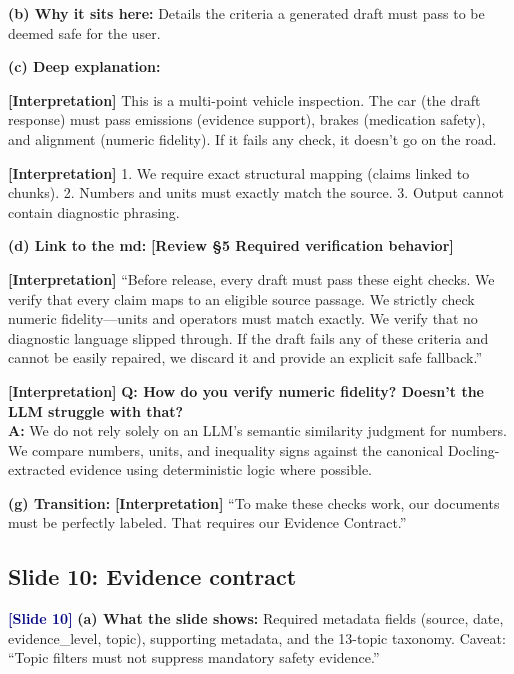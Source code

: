 \documentclass[11pt,a4paper]{article}
\newcommand{\origintag}[2]{\textcolor{#1}{\small\textbf{[#2]}}}
\begin{document}
\textbf{(b) Why it sits here:} Details the criteria a generated draft must pass to be deemed safe for the user.

\textbf{(c) Deep explanation:}
\begin{analogy}
\origintag{slate}{Interpretation} This is a multi-point vehicle inspection. The car (the draft response) must pass emissions (evidence support), brakes (medication safety), and alignment (numeric fidelity). If it fails any check, it doesn't go on the road.
\end{analogy}
\origintag{slate}{Interpretation} 1. We require exact structural mapping (claims linked to chunks). 2. Numbers and units must exactly match the source. 3. Output cannot contain diagnostic phrasing.

\textbf{(d) Link to the md:} \origintag{amber}{Review \S5 Required verification behavior}

\begin{sayit}
\origintag{slate}{Interpretation} ``Before release, every draft must pass these eight checks. We verify that every claim maps to an eligible source passage. We strictly check numeric fidelity---units and operators must match exactly. We verify that no diagnostic language slipped through. If the draft fails any of these criteria and cannot be easily repaired, we discard it and provide an explicit safe fallback.''
\end{sayit}

\begin{qa}
\origintag{slate}{Interpretation} \textbf{Q: How do you verify numeric fidelity? Doesn't the LLM struggle with that?} \\
\textbf{A:} We do not rely solely on an LLM's semantic similarity judgment for numbers. We compare numbers, units, and inequality signs against the canonical Docling-extracted evidence using deterministic logic where possible.
\end{qa}
\textbf{(g) Transition:} \origintag{slate}{Interpretation} ``To make these checks work, our documents must be perfectly labeled. That requires our Evidence Contract.''

\subsection{Slide 10: Evidence contract}
\origintag{navy}{Slide 10}
\textbf{(a) What the slide shows:} Required metadata fields (source, date, evidence\_level, topic), supporting metadata, and the 13-topic taxonomy. Caveat: ``Topic filters must not suppress mandatory safety evidence.''
\end{document}
